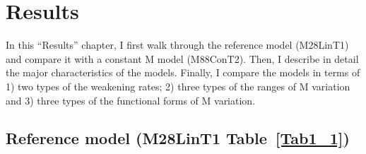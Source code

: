 \pagebreak
\section{Results}
In this ``Results'' chapter, I first walk through the reference model (M28LinT1) and compare it with a constant M model (M88ConT2). Then, I describe in detail the major characteristics of the models. Finally, I compare the models in terms of 1) two types of the weakening rates; 2) three types of the ranges of M variation and 3) three types of the functional forms of M variation.

\subsection{Reference model (M28LinT1 Table~\hyperref[Tab1_1]{\ref{Tab1_1}})}\label{sec_M28LinT1}

